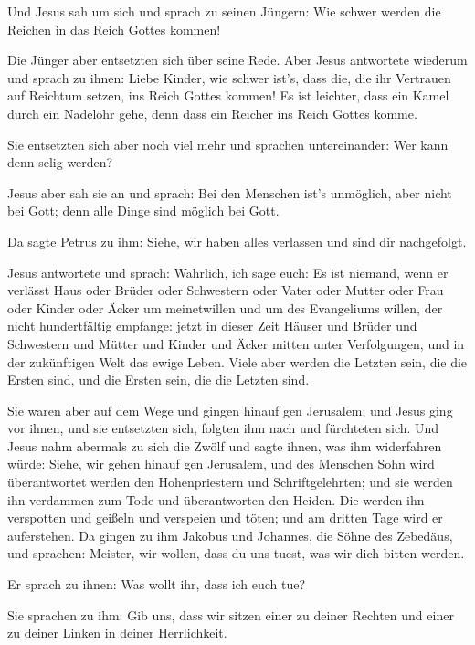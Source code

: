  Und Jesus sah um sich und sprach zu seinen Jüngern: Wie
schwer werden die Reichen in das Reich Gottes kommen!

 Die Jünger aber entsetzten sich über seine Rede. Aber
Jesus antwortete wiederum und sprach zu ihnen: Liebe Kinder, wie schwer
ist's, dass die, die ihr Vertrauen auf Reichtum setzen, ins Reich Gottes
kommen!  Es ist leichter, dass ein Kamel durch ein
Nadelöhr gehe, denn dass ein Reicher ins Reich Gottes komme.

 Sie entsetzten sich aber noch viel mehr und sprachen
untereinander: Wer kann denn selig werden?

 Jesus aber sah sie an und sprach: Bei den Menschen ist's
unmöglich, aber nicht bei Gott; denn alle Dinge sind möglich bei Gott.

 Da sagte Petrus zu ihm: Siehe, wir haben alles verlassen
und sind dir nachgefolgt.

 Jesus antwortete und sprach: Wahrlich, ich sage euch: Es
ist niemand, wenn er verlässt Haus oder Brüder oder Schwestern oder
Vater oder Mutter oder Frau oder Kinder oder Äcker um meinetwillen und
um des Evangeliums willen,  der nicht hundertfältig
empfange: jetzt in dieser Zeit Häuser und Brüder und Schwestern und
Mütter und Kinder und Äcker mitten unter Verfolgungen, und in der
zukünftigen Welt das ewige Leben.  Viele aber werden die
Letzten sein, die die Ersten sind, und die Ersten sein, die die Letzten
sind.

 Sie waren aber auf dem Wege und gingen hinauf gen
Jerusalem; und Jesus ging vor ihnen, und sie entsetzten sich, folgten
ihm nach und fürchteten sich. Und Jesus nahm abermals zu sich die Zwölf
und sagte ihnen, was ihm widerfahren würde:  Siehe, wir
gehen hinauf gen Jerusalem, und des Menschen Sohn wird überantwortet
werden den Hohenpriestern und Schriftgelehrten; und sie werden ihn
verdammen zum Tode und überantworten den Heiden.  Die
werden ihn verspotten und geißeln und verspeien und töten; und am
dritten Tage wird er auferstehen.  Da gingen zu ihm
Jakobus und Johannes, die Söhne des Zebedäus, und sprachen: Meister, wir
wollen, dass du uns tuest, was wir dich bitten werden.

 Er sprach zu ihnen: Was wollt ihr, dass ich euch tue?

 Sie sprachen zu ihm: Gib uns, dass wir sitzen einer zu
deiner Rechten und einer zu deiner Linken in deiner Herrlichkeit.

